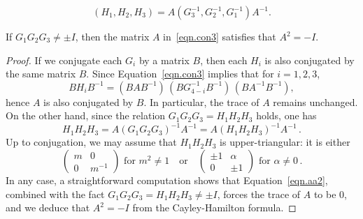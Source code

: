 \documentclass[10pt,a4paper]{amsart}
\begin{document}
\begin{equation}
    \label{eqn.con3}
    (H_1,H_2,H_3) = A(G_3^{-1},G_2^{-1},G_1^{-1})A^{-1}.
\end{equation}

\begin{lemma} 
\label{lem.AA}
If $G_1G_2G_3 \neq \pm I$, then the matrix $A$ in~\eqref{eqn.con3} satisfies that $A^2 = -I$.
\end{lemma}

\begin{proof}
If we conjugate each $G_i$ by a matrix $B$, then each $H_i$ is also conjugated by the same matrix $B$. Since Equation~\eqref{eqn.con3} implies that for $i=1,2,3$,
\begin{equation}
    BH_iB^{-1} = (BAB^{-1}) \, (BG_{4-i}^{-1}B^{-1}) \, (BA^{-1}B^{-1}),
\end{equation}
hence $A$ is also conjugated by $B$. In particular, the trace of $A$ remains unchanged.
On the other hand, since the relation $G_1G_2G_3 = H_1H_2H_3$ holds, one has
\begin{equation}
\label{eqn.aa2}
    H_1 H_2 H_3 = A (G_1 G_2G_3)^{-1} A^{-1} = A(H_1 H_2 H_3)^{-1} A^{-1} \,.
\end{equation}
Up to conjugation, we may assume that $H_1H_2H_3$ is upper-triangular: it is either
$$
\begin{pmatrix}
    m & 0 \\ 0 & m^{-1} 
\end{pmatrix}
\text{ for } m^2 \neq 1
\quad \text{or} \quad
\begin{pmatrix}
    \pm 1 & \alpha \\ 0 & \pm1 
\end{pmatrix}
\text{ for } \alpha \neq 0 \,.
$$
In any case, a straightforward computation shows that Equation~\eqref{eqn.aa2}, combined with the fact $G_1 G_2 G_3 = H_1 H_2 H_3 \neq \pm I$, forces the trace of $A$ to be 0, and we deduce that $A^2=-I$ from the Cayley-Hamilton formula.
\end{proof}
\end{document}
